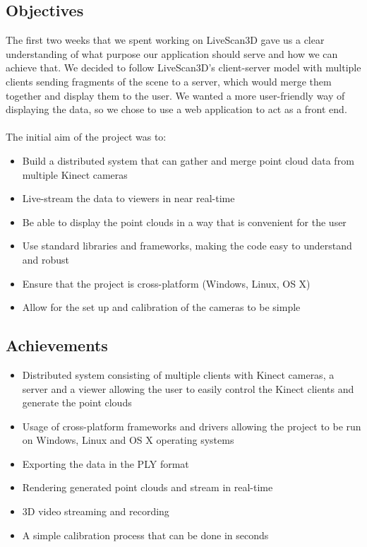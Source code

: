 \documentclass{article}
\begin{document}
\subsection{Objectives}
The first two weeks that we spent working on LiveScan3D gave us a clear understanding of what purpose our application should serve and how we can achieve that. We decided to follow LiveScan3D's client-server model with multiple clients sending fragments of the scene to a server, which would merge them together and display them to the user. We wanted a more user-friendly way of displaying the data, so we chose to use a web application to act as a front end.
\\\\
The initial aim of the project was to:
\begin{itemize}
  \item Build a distributed system that can gather and merge point cloud data from multiple Kinect cameras
  \item Live-stream the data to viewers in near real-time
  \item Be able to display the point clouds in a way that is convenient for the user
  \item Use standard libraries and frameworks, making the code easy to understand and robust
  \item Ensure that the project is cross-platform (Windows, Linux, OS X)
  \item Allow for the set up and calibration of the cameras to be simple
\end{itemize}

\subsection{Achievements}
\begin{itemize}
  \item Distributed system consisting of multiple clients with Kinect cameras, a server and a viewer allowing the user to easily control the Kinect clients and generate the point clouds
  \item Usage of cross-platform frameworks and drivers allowing the project to be run on Windows, Linux and OS X operating systems
  \item Exporting the data in the PLY format
  \item Rendering generated point clouds and stream in real-time
  \item 3D video streaming and recording
  \item A simple calibration process that can be done in seconds
\end{itemize}
\end{document}
